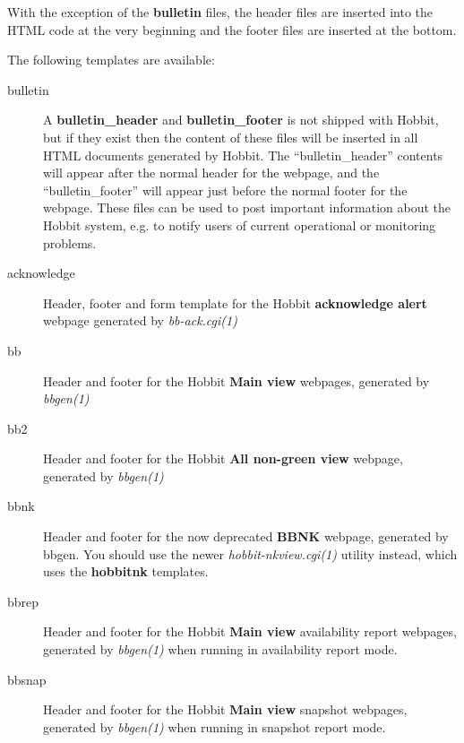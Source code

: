   With the exception of the \textbf{bulletin}
 files, the header files are inserted into the HTML code at the very beginning and the footer files are inserted at the bottom. 


  The following templates are available: 


 \begin{description}
\item[bulletin] A \textbf{bulletin\_header}
 and \textbf{bulletin\_footer}
 is not shipped with Hobbit, but if they exist then the content of these files will be inserted in all HTML documents generated by Hobbit. The ``bulletin\_header'' contents will appear after the normal header for the webpage, and the ``bulletin\_footer'' will appear just before the normal footer for the webpage. These files can be used to post important information about the Hobbit system, e.g. to notify users of current operational or monitoring problems. 

 

\item[acknowledge] Header, footer and form template for the Hobbit \textbf{acknowledge alert}
 webpage generated by \emph{bb-ack.cgi(1)}


 

\item[bb] Header and footer for the Hobbit \textbf{Main view}
 webpages, generated by \emph{bbgen(1)}


 

\item[bb2] Header and footer for the Hobbit \textbf{All non-green view}
 webpage, generated by \emph{bbgen(1)}


 

\item[bbnk] Header and footer for the now deprecated \textbf{BBNK}
 webpage, generated by bbgen. You should use the newer \emph{hobbit-nkview.cgi(1)}
 utility instead, which uses the \textbf{hobbitnk}
 templates. 

 

\item[bbrep] Header and footer for the Hobbit \textbf{Main view}
 availability report webpages, generated by \emph{bbgen(1)}
 when running in availability report mode. 

 

\item[bbsnap] Header and footer for the Hobbit \textbf{Main view}
 snapshot webpages, generated by \emph{bbgen(1)}
 when running in snapshot report mode. 


\end{description}
